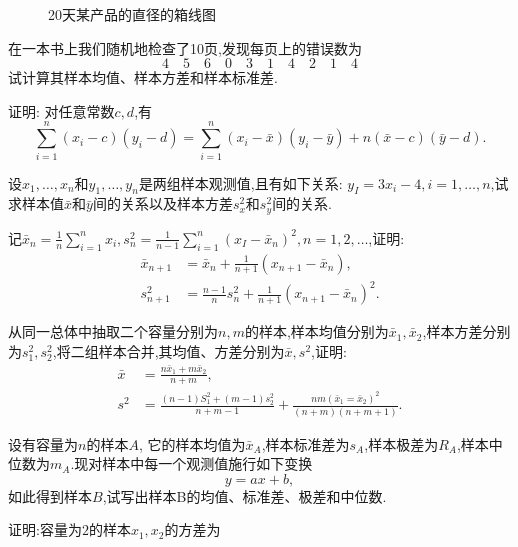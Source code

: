 \begin{figure}[!ht]
  \caption{20天某产品的直径的箱线图}\label{fig:5.3.9}
\end{figure}

\begin{xiti}
\item 在一本书上我们随机地检查了10页,发现每页上的错误数为
\[4\quad5\quad6\quad0\quad3\quad1\quad4\quad2\quad1\quad4\]
试计算其样本均值、样本方差和样本标准差.
\item 证明: 对任意常数$c,d$,有
\[\sum_{i=1}^n(x_i-c)(y_i-d)=\sum_{i=1}^n(x_i-\bar x)(y_i-\bar y)+n(\bar x-c)(\bar y-d).\]
\item 设$x_1,\dotsc,x_n$和$y_1,\dotsc,y_n$是两组样本观测值,且有如下关系: $y_I=3x_i-4,i=1,\dotsc,n$,试求样本值$\bar x$和$\bar y$间的关系以及样本方差$s_x^2$和$s_y^2$间的关系.
\item 记$\bar x_n=\frac1n\sum_{i=1}^n x_i,s_n^2=\frac1{n-1}\sum_{i=1}^n(x_I-\bar x_n)^2,n=1,2,\dotsc$,证明:
\begin{align*}
\bar x_{n+1}&=\bar x_n+\frac1{n+1}(x_{n+1}-\bar x_n),\\
s_{n+1}^2&=\frac{n-1}ns_n^2+\frac1{n+1}(x_{n+1}-\bar x_n)^2.
\end{align*}
\item 从同一总体中抽取二个容量分别为$n,m$的样本,样本均值分别为$\bar x_1,\bar x_2$,样本方差分别为$s_1^2,s_2^2$,将二组样本合并,其均值、方差分别为$\bar x,s^2$,证明:
\begin{align*}
\bar x&=\frac{n\bar x_1+m\bar x_2}{n+m},\\
s^2&=\frac{(n-1)S_1^2+(m-1)s_2^2}{n+m-1}+\frac{nm(\bar x_1=\bar x_2)^2}{(n+m)(n+m+1)}.
\end{align*}
\item 设有容量为$n$的样本$A$, 它的样本均值为$\bar x_A$,样本标准差为$s_A$,样本极差为$R_A$,样本中位数为$m_A$.现对样本中每一个观测值施行如下变换
\[y=ax+b,\]
如此得到样本$B$,试写出样本B的均值、标准差、极差和中位数.
\item 证明:容量为$2$的样本$x_1,x_2$的方差为

\end{xiti}
